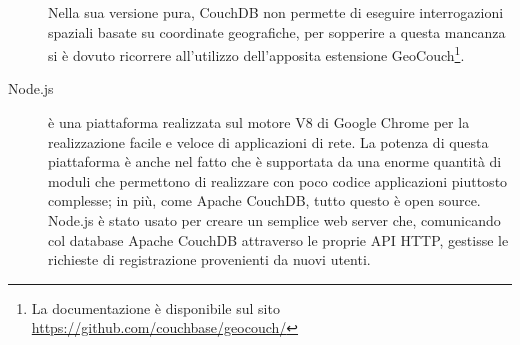 \begin{description}
                Nella sua versione pura, CouchDB non permette di eseguire interrogazioni
                spaziali basate su coordinate geografiche, per sopperire a questa
                mancanza si è dovuto ricorrere all'utilizzo dell'apposita estensione
                GeoCouch\footnote{La documentazione
                è disponibile sul sito \url{https://github.com/couchbase/geocouch/}}.
            \item[Node.js] è una piattaforma realizzata sul motore \js{} V8 di
                Google Chrome per la realizzazione facile e veloce di
                applicazioni di rete. La potenza di questa piattaforma è anche
                nel fatto che è supportata da una enorme quantità di moduli
                che permettono di realizzare con poco codice applicazioni piuttosto
                complesse; in più, come Apache CouchDB\texttrademark{}, tutto
                questo è open source. Node.js è stato usato per creare un
                semplice web server che, comunicando col database Apache CouchDB\texttrademark{}
                attraverso le proprie API HTTP, gestisse le richieste di
                registrazione provenienti da nuovi utenti.
        \end{description}

